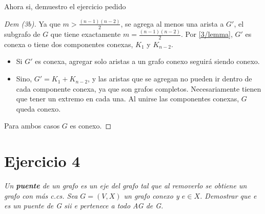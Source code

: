 \documentclass[12pt, a4paper]{report}
\theoremstyle{definition} %
\begin{document}
\begin{enumerate}[a)]
    Ahora si, demuestro el ejercicio pedido
    \begin{proof}[Dem (3b)]
        Ya que $m > \frac{(n-1)(n-2)}{2}$, se agrega al menos una arista a $G'$, el subgrafo de $G$ que tiene exactamente $m = \frac{(n-1)(n-2)}{2}$. Por \eqref{3/lemma}, $G'$ es conexa o tiene dos componentes conexas, $K_1$ y $K_{n-2}$.
        
        \begin{itemize}
            \item Si $G'$ es conexa, agregar solo aristas a un grafo conexo seguirá siendo conexo.
            \item Sino, $G' = K_1 + K_{n-2}$, y las aristas que se agregan no pueden ir dentro de cada componente conexa, ya que son grafos completos. Necesariamente tienen que tener un extremo en cada una. Al unirse las componentes conexas, $G$ queda conexo.
        \end{itemize}

        Para ambos casos $G$ es conexo.
    \end{proof}
    
\end{enumerate}

\newpage
\section*{Ejercicio 4}

\textit{Un \textbf{puente} de un grafo es un eje del grafo tal que al removerlo
se obtiene un grafo con más c.cs. Sea $G = (V, X)$ un grafo conexo y $e \in X$.
Demostrar que e es un puente de G sii e pertenece a todo AG de G.}
\end{document}
